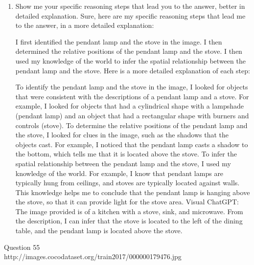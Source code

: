 \begin{enumerate}
    Here are some additional details about the spatial relationship between the pendant lamp and the stove:
    
    The pendant lamp is a light fixture that is suspended from the ceiling.
    The stove is a large, electric appliance that is used for cooking food.
    The pendant lamp is hanging above the stove, meaning that it is located directly above the stove.
    The stove is located below the pendant lamp, meaning that it is located directly below the pendant lamp.
    \subitem Visual ChatGPT: The pendant lamp is located above the stove.
    \item Show me your specific reasoning steps that lead you to the answer, better in detailed explanation.
    \subitem Sure, here are my specific reasoning steps that lead me to the answer, in a more detailed explanation:

    I first identified the pendant lamp and the stove in the image.
    I then determined the relative positions of the pendant lamp and the stove.
    I then used my knowledge of the world to infer the spatial relationship between the pendant lamp and the stove.
    Here is a more detailed explanation of each step:
    
    To identify the pendant lamp and the stove in the image, I looked for objects that were consistent with the descriptions of a pendant lamp and a stove. For example, I looked for objects that had a cylindrical shape with a lampshade (pendant lamp) and an object that had a rectangular shape with burners and controls (stove).
    To determine the relative positions of the pendant lamp and the stove, I looked for clues in the image, such as the shadows that the objects cast. For example, I noticed that the pendant lamp casts a shadow to the bottom, which tells me that it is located above the stove.
    To infer the spatial relationship between the pendant lamp and the stove, I used my knowledge of the world. For example, I know that pendant lamps are typically hung from ceilings, and stoves are typically located against walls. This knowledge helps me to conclude that the pendant lamp is hanging above the stove, so that it can provide light for the stove area.
    \subitem Visual ChatGPT: The image provided is of a kitchen with a stove, sink, and microwave. From the description, I can infer that the stove is located to the left of the dining table, and the pendant lamp is located above the stove.
\end{enumerate}
Question 55\\
http://images.cocodataset.org/train2017/000000179476.jpg
